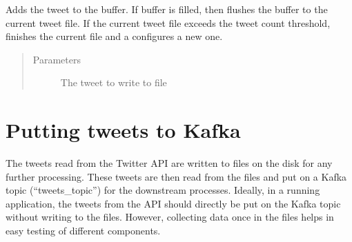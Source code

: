 \documentclass[letterpaper,10pt,english]{sphinxmanual}
\begin{document}
\begin{fulllineitems}
\begin{fulllineitems}
\begin{quote}
\begin{description}
\end{description}\end{quote}

\end{fulllineitems}


\begin{fulllineitems}
\label{\detokenize{twitter_stream:streaming.Logger.write_tweet}}
Adds the tweet to the buffer. If buffer is filled, then flushes the buffer to the current tweet file.
If the current tweet file exceeds the tweet count threshold, finishes the current file and a configures a new one.
\begin{quote}\begin{description}
\item[{Parameters}] \leavevmode
{} \textendash{} The tweet to write to file

\end{description}\end{quote}

\end{fulllineitems}


\end{fulllineitems}


\begin{fulllineitems}
\label{\detokenize{twitter_stream:streaming.signal_handler}}
\end{fulllineitems}



\chapter{Putting tweets to Kafka}
\label{\detokenize{kafka:putting-tweets-to-kafka}}\label{\detokenize{kafka::doc}}
The tweets read from the Twitter API are written to files on the disk for any further processing. These tweets are then read from the files and put on a Kafka topic (“tweets\_topic”) for the downstream processes. Ideally, in a running application, the tweets from the API should directly be put on the Kafka topic without writing to the files. However, collecting data once in the files helps in easy testing of different components.
\end{document}
